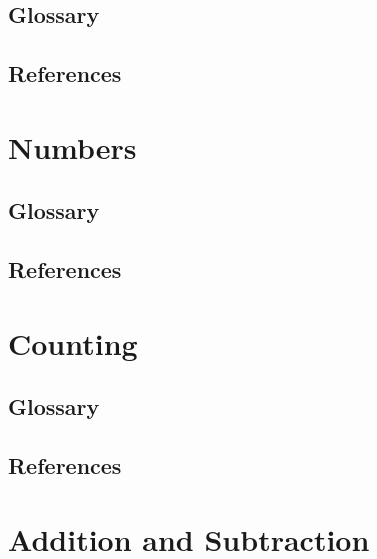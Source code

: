 \documentclass[12pt]{book}
\begin{document}
\section{Glossary}
\section{References}
\newpage

\chapter{Numbers}%
\section{Glossary}
\section{References}
\newpage



\chapter{Counting}%
\section{Glossary}
\section{References}
\newpage

\chapter{Addition and Subtraction}%
\end{document}
